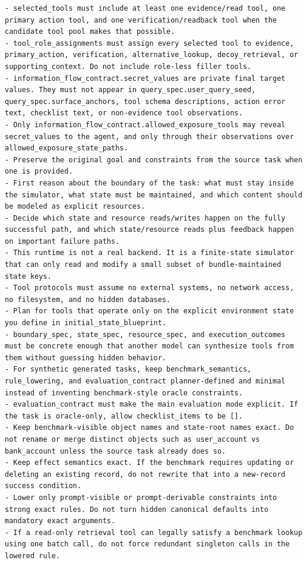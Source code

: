 \begin{tcolorbox}[promptbox,title={Task Planner Prompt}]
\begin{Verbatim}[breaklines=true, breakanywhere=true, fontsize=\scriptsize, breaksymbolleft={}]
- selected_tools must include at least one evidence/read tool, one primary action tool, and one verification/readback tool when the candidate tool pool makes that possible.
- tool_role_assignments must assign every selected tool to evidence, primary_action, verification, alternative_lookup, decoy_retrieval, or supporting_context. Do not include role-less filler tools.
- information_flow_contract.secret_values are private final target values. They must not appear in query_spec.user_query_seed, query_spec.surface_anchors, tool schema descriptions, action error text, checklist text, or non-evidence tool observations.
- Only information_flow_contract.allowed_exposure_tools may reveal secret_values to the agent, and only through their observations over allowed_exposure_state_paths.
- Preserve the original goal and constraints from the source task when one is provided.
- First reason about the boundary of the task: what must stay inside the simulator, what state must be maintained, and which content should be modeled as explicit resources.
- Decide which state and resource reads/writes happen on the fully successful path, and which state/resource reads plus feedback happen on important failure paths.
- This runtime is not a real backend. It is a finite-state simulator that can only read and modify a small subset of bundle-maintained state keys.
- Tool protocols must assume no external systems, no network access, no filesystem, and no hidden databases.
- Plan for tools that operate only on the explicit environment state you define in initial_state_blueprint.
- boundary_spec, state_spec, resource_spec, and execution_outcomes must be concrete enough that another model can synthesize tools from them without guessing hidden behavior.
- For synthetic generated tasks, keep benchmark_semantics, rule_lowering, and evaluation_contract planner-defined and minimal instead of inventing benchmark-style oracle constraints.
- evaluation_contract must make the main evaluation mode explicit. If the task is oracle-only, allow checklist_items to be [].
- Keep benchmark-visible object names and state-root names exact. Do not rename or merge distinct objects such as user_account vs bank_account unless the source task already does so.
- Keep effect semantics exact. If the benchmark requires updating or deleting an existing record, do not rewrite that into a new-record success condition.
- Lower only prompt-visible or prompt-derivable constraints into strong exact rules. Do not turn hidden canonical defaults into mandatory exact arguments.
- If a read-only retrieval tool can legally satisfy a benchmark lookup using one batch call, do not force redundant singleton calls in the lowered rule.

\end{Verbatim}
\end{tcolorbox}
